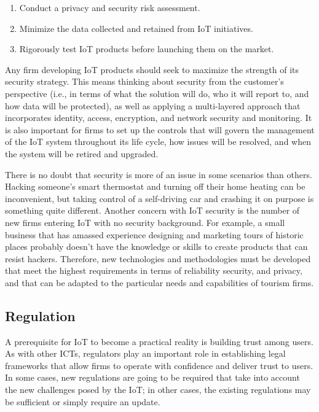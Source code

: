 \documentclass[
  letterpaper,
  DIV=11,
  numbers=noendperiod]{scrreprt}
\begin{document}
\begin{enumerate}
\def\labelenumi{\arabic{enumi}.}
\item
  Conduct a privacy and security risk assessment.
\item
  Minimize the data collected and retained from IoT initiatives.
\item
  Rigorously test IoT products before launching them on the market.
\end{enumerate}

Any firm developing IoT products should seek to maximize the strength of
its security strategy. This means thinking about security from the
customer's perspective (i.e., in terms of what the solution will do, who
it will report to, and how data will be protected), as well as applying
a multi-layered approach that incorporates identity, access, encryption,
and network security and monitoring. It is also important for firms to
set up the controls that will govern the management of the IoT system
throughout its life cycle, how issues will be resolved, and when the
system will be retired and upgraded.

There is no doubt that security is more of an issue in some scenarios
than others. Hacking someone's smart thermostat and turning off their
home heating can be inconvenient, but taking control of a self-driving
car and crashing it on purpose is something quite different. Another
concern with IoT security is the number of new firms entering IoT with
no security background. For example, a small business that has amassed
experience designing and marketing tours of historic places probably
doesn't have the knowledge or skills to create products that can resist
hackers. Therefore, new technologies and methodologies must be developed
that meet the highest requirements in terms of reliability security, and
privacy, and that can be adapted to the particular needs and
capabilities of tourism firms.

\hypertarget{regulation}{%
\subsection{Regulation}\label{regulation}}

A prerequisite for IoT to become a practical reality is building trust
among users. As with other ICTs, regulators play an important role in
establishing legal frameworks that allow firms to operate with
confidence and deliver trust to users. In some cases, new regulations
are going to be required that take into account the new challenges posed
by the IoT; in other cases, the existing regulations may be sufficient
or simply require an update.
\end{document}
